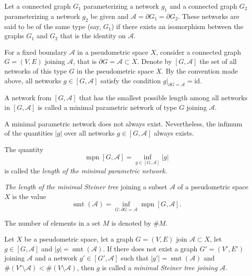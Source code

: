 \documentclass{svproc}
\def\mpn{\operatorname{mpn}}
\def\smt{\operatorname{smt}}
\begin{document}
\begin{definition}
Let a connected graph $G_1$ parameterizing a network $g_1$ and a connected graph $G_2$ parameterizing a network $g_2$ be given and $\mathcal{A} = \partial G_1 = \partial G_2$. These networks are said to be of the same type (say, $G_1$) if there exists an isomorphism between the graphs $G_1$ and $G_2$ that is the identity on $\mathcal{A}$.
\end{definition}

For a fixed boundary $\mathcal{A}$ in a pseudometric space $X$, consider a connected graph $G = (V, E)$ joining $\mathcal{A}$, that is $\partial G = \mathcal{A}\subset X$. Denote by $[G, \mathcal{A}]$ the set of all networks of this type $G$ in the pseudometric space $X$. By the convention made above, all networks $g\in [G, \mathcal{A}]$ satisfy the condition $g\big|_{\partial G = \mathcal{A}} = \text{id}$. 

\begin{definition}\label{dfn:mpn}
A network from $[G, \mathcal{A}]$ that has the smallest possible length among all networks in $[G, \mathcal{A}]$ is called a minimal parametric network of type $G$ joining $\mathcal{A}$.
\end{definition}

A minimal parametric network does not always exist. Nevertheless, the infimum of the quantities $|g|$ over all networks $g\in [G, \mathcal{A}]$ always exists. 

\begin{definition}
The quantity $$\mpn[G, \mathcal{A}] = \inf\limits_{g\in [G, \mathcal{A}]} |g|$$ is called the \textit{length of the minimal parametric network.}
\end{definition}

\begin{definition}
\textit{The length of the minimal Steiner tree} joining a subset $\mathcal{A}$ of a pseudometric space $X$ is the value
$$\smt(\mathcal{A}) = \inf\limits_{G\colon \partial G = \mathcal{A}} \mpn[G, \mathcal{A}].$$
\end{definition}

The number of elements in a set $M$ is denoted by $\# M$.

\begin{definition}\label{dfn:mst}
Let $X$ be a pseudometric space, let a graph $G = (V, E)$ join $\mathcal{A}\subset X$, let $g\in [G, \mathcal{A}]$ and $|g| = \smt(\mathcal{A})$. If there does not exist a graph $G' = (V', E')$ joining $\mathcal{A}$ and a network $g'\in [G', \mathcal{A}]$ such that $|g'| = \smt(\mathcal{A})$ and $\# (V'\setminus \mathcal{A}) < \# (V\setminus \mathcal{A})$, then $g$ is called a \textit{minimal Steiner tree joining} $\mathcal{A}$.
\end{definition}
\end{document}
